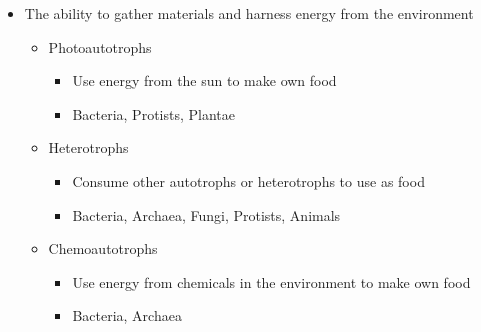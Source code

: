 \documentclass[10pt, oneside]{article}
\begin{document}
\begin{itemize}
\begin{itemize}
	\item The ability to gather materials and harness energy from the environment
	\begin{itemize}
		\item Photoautotrophs
		\begin{itemize}
			\item Use energy from the sun to make own food
			\item Bacteria, Protists, Plantae
		\end{itemize}
		\item Heterotrophs
		\begin{itemize}
			\item Consume other autotrophs or heterotrophs to use as food
			\item Bacteria, Archaea, Fungi, Protists, Animals
		\end{itemize}
		\item Chemoautotrophs
		\begin{itemize}
			\item Use energy from chemicals in the environment to make own food
			\item Bacteria, Archaea
		\end{itemize}
\end{itemize}
\end{itemize}
\end{itemize}
\end{document}

